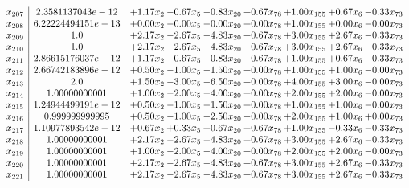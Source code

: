 \documentclass[8pt]{article}
\begin{document}
\[\begin{array}{c| c c@{\hskip 2pt} c@{\hskip 2pt} c@{\hskip 2pt} c@{\hskip 2pt} c@{\hskip 2pt} c@{\hskip 2pt} c@{\hskip 2pt} }
 x_{207}   &  2.3581137043e-12 & +  1.17 x_{2} & -0.67 x_{5} & -0.83 x_{20} & +  0.67 x_{78} & +  1.00 x_{155} & +  0.67 x_{6} & -0.33 x_{73}\\
 x_{208}   &  6.22224494151e-13 & +  0.00 x_{2} & -0.00 x_{5} & -0.00 x_{20} & +  0.00 x_{78} & +  1.00 x_{155} & +  0.00 x_{6} & -0.00 x_{73}\\
 x_{209}   &  1.0 & +  2.17 x_{2} & -2.67 x_{5} & -4.83 x_{20} & +  0.67 x_{78} & +  3.00 x_{155} & +  2.67 x_{6} & -0.33 x_{73}\\
 x_{210}   &  1.0 & +  2.17 x_{2} & -2.67 x_{5} & -4.83 x_{20} & +  0.67 x_{78} & +  3.00 x_{155} & +  2.67 x_{6} & -0.33 x_{73}\\
 x_{211}   &  2.86615176037e-12 & +  1.17 x_{2} & -0.67 x_{5} & -0.83 x_{20} & +  0.67 x_{78} & +  1.00 x_{155} & +  0.67 x_{6} & -0.33 x_{73}\\
 x_{212}   &  2.66742183896e-12 & +  0.50 x_{2} & -1.00 x_{5} & -1.50 x_{20} & +  0.00 x_{78} & +  1.00 x_{155} & +  1.00 x_{6} & -0.00 x_{73}\\
 x_{213}   &  2.0 & +  1.50 x_{2} & -3.00 x_{5} & -6.50 x_{20} & +  0.00 x_{78} & +  4.00 x_{155} & +  3.00 x_{6} & -0.00 x_{73}\\
 x_{214}   &  1.00000000001 & +  1.00 x_{2} & -2.00 x_{5} & -4.00 x_{20} & +  0.00 x_{78} & +  2.00 x_{155} & +  2.00 x_{6} & -0.00 x_{73}\\
 x_{215}   &  1.24944499191e-12 & +  0.50 x_{2} & -1.00 x_{5} & -1.50 x_{20} & +  0.00 x_{78} & +  1.00 x_{155} & +  1.00 x_{6} & -0.00 x_{73}\\
 x_{216}   &  0.999999999995 & +  0.50 x_{2} & -1.00 x_{5} & -2.50 x_{20} & -0.00 x_{78} & +  2.00 x_{155} & +  1.00 x_{6} & +  0.00 x_{73}\\
 x_{217}   &  1.10977893542e-12 & +  0.67 x_{2} & +  0.33 x_{5} & +  0.67 x_{20} & +  0.67 x_{78} & +  1.00 x_{155} & -0.33 x_{6} & -0.33 x_{73}\\
 x_{218}   &  1.00000000001 & +  2.17 x_{2} & -2.67 x_{5} & -4.83 x_{20} & +  0.67 x_{78} & +  3.00 x_{155} & +  2.67 x_{6} & -0.33 x_{73}\\
 x_{219}   &  1.00000000001 & +  1.00 x_{2} & -2.00 x_{5} & -4.00 x_{20} & +  0.00 x_{78} & +  2.00 x_{155} & +  2.00 x_{6} & -0.00 x_{73}\\
 x_{220}   &  1.00000000001 & +  2.17 x_{2} & -2.67 x_{5} & -4.83 x_{20} & +  0.67 x_{78} & +  3.00 x_{155} & +  2.67 x_{6} & -0.33 x_{73}\\
 x_{221}   &  1.00000000001 & +  2.17 x_{2} & -2.67 x_{5} & -4.83 x_{20} & +  0.67 x_{78} & +  3.00 x_{155} & +  2.67 x_{6} & -0.33 x_{73}\\

\end{array}\]
\end{document}
